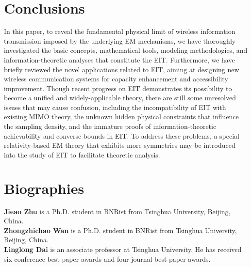 \documentclass[journal,twocolumn]{IEEEtran}
\begin{document}
\section{Conclusions}
In this paper, to reveal the fundamental physical limit of wireless information transmission imposed by the underlying EM mechanisms, we have thoroughly investigated the basic concepts, mathematical tools, modeling methodologies, and information-theoretic analyses that constitute the EIT. 
Furthermore, we have briefly reviewed the novel applications related to EIT, aiming at designing new wireless communication systems for capacity enhancement and accessibility improvement. Though recent progress on EIT demonstrates its possibility to become a unified and widely-applicable theory, there are still some unresolved issues that may cause confusion, including the incompatibility of EIT with existing MIMO theory, the unknown hidden physical constraints that influence the sampling density, and the immature proofs of information-theoretic achievability and converse bounds in EIT. %
To address these problems, a special relativity-based EM theory that exhibits more symmetries may be introduced into the study of EIT to facilitate theoretic analysis.  


\footnotesize




\normalsize
\section*{Biographies}

{\bf Jieao Zhu} is a Ph.D. student in BNRist from Tsinghua University, Beijing, China.
\\

{\bf Zhongzhichao Wan} is a Ph.D. student in BNRist from Tsinghua University, Beijing, China.
\\


{\bf Linglong Dai} is an associate professor at Tsinghua University. He has received six conference best paper awards and four journal best paper awards. 
\end{document}
